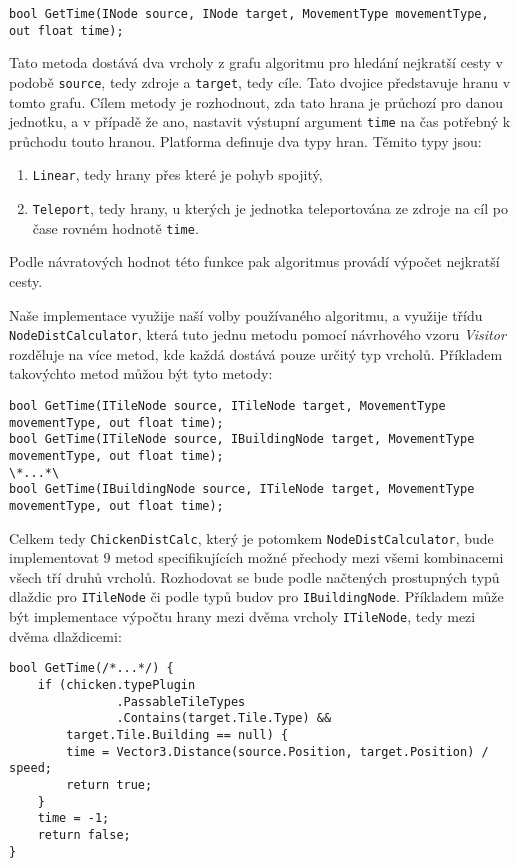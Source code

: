 \begin{lstlisting}
bool GetTime(INode source, INode target, MovementType movementType, out float time);
\end{lstlisting}

Tato metoda dostává dva vrcholy z grafu algoritmu pro hledání nejkratší cesty v podobě \texttt{source}, tedy zdroje a \texttt{target}, tedy cíle. Tato dvojice představuje hranu v tomto grafu. Cílem metody je rozhodnout, zda tato hrana je průchozí pro danou jednotku, a v případě že ano, nastavit výstupní argument \texttt{time} na čas potřebný k průchodu touto hranou. Platforma definuje dva typy hran. Těmito typy jsou:
\begin{enumerate}
	\item \texttt{Linear}, tedy hrany přes které je pohyb spojitý,
	\item \texttt{Teleport}, tedy hrany, u kterých je jednotka teleportována ze zdroje na cíl po čase rovném hodnotě \texttt{time}.
\end{enumerate}

Podle návratových hodnot této funkce pak algoritmus provádí výpočet nejkratší cesty. 

Naše implementace využije naší volby používaného algoritmu, a využije třídu \texttt{NodeDistCalculator}, která tuto jednu metodu pomocí návrhového vzoru \textit{Visitor} rozděluje na více metod, kde každá dostává pouze určitý typ vrcholů. Příkladem takovýchto metod můžou být tyto metody:

\begin{lstlisting}
bool GetTime(ITileNode source, ITileNode target, MovementType movementType, out float time);
bool GetTime(ITileNode source, IBuildingNode target, MovementType movementType, out float time);
\*...*\
bool GetTime(IBuildingNode source, ITileNode target, MovementType movementType, out float time);
\end{lstlisting}

Celkem tedy \texttt{ChickenDistCalc}, který je potomkem \texttt{NodeDistCalculator}, bude implementovat 9 metod specifikujících možné přechody mezi všemi kombinacemi všech tří druhů vrcholů. Rozhodovat se bude podle načtených prostupných typů dlaždic pro \texttt{ITileNode} či podle typů budov pro \texttt{IBuildingNode}. Příkladem může být implementace výpočtu hrany mezi dvěma vrcholy \texttt{ITileNode}, tedy mezi dvěma dlaždicemi:

\begin{lstlisting}
bool GetTime(/*...*/) {
	if (chicken.typePlugin
		       .PassableTileTypes
		       .Contains(target.Tile.Type) &&
		target.Tile.Building == null) {
		time = Vector3.Distance(source.Position, target.Position) / speed;
		return true;
	}
	time = -1;
	return false;
}
\end{lstlisting}

